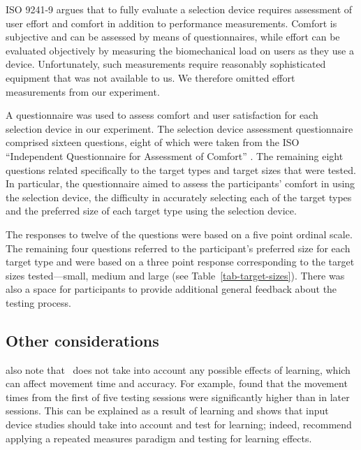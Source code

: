 \documentclass{elsart}
\begin{document}
ISO 9241-9 argues that to fully evaluate a selection device requires
assessment of user effort and comfort in addition to performance
measurements. Comfort is subjective and can be assessed by means of
questionnaires, while effort can be evaluated objectively by measuring
the biomechanical load on users as they use a device. Unfortunately,
such measurements require reasonably sophisticated equipment
\citep{Doug-SA-1999-CHI} that was not available to us. We therefore
omitted effort measurements from our experiment.

A questionnaire was used to assess comfort and user satisfaction for
each selection device in our experiment. The selection device assessment
questionnaire comprised sixteen questions, eight of which were taken
from the ISO ``Independent Questionnaire for Assessment of Comfort''
\citep{Doug-SA-1999-CHI}. The remaining eight questions related
specifically to the target types and target sizes that were tested. In
particular, the questionnaire aimed to assess the participants' comfort
in using the selection device, the difficulty in accurately selecting each
of the target types and the preferred size of each target type using the
selection device.

The responses to twelve of the questions were based on a five point
ordinal scale. The remaining four questions referred to the
participant's preferred size for each target type and were based on a
three point response corresponding to the target sizes tested---small,
medium and large (see Table~\ref{tab-target-sizes}). There was also a
space for participants to provide additional general feedback about the
testing process.


\subsection{Other considerations}
\label{sec-evaluation-other}

\citet{Doug-SA-1999-CHI} also note that \ISOnine\ does not take into
account any possible effects of learning, which can affect movement time
and accuracy. For example, \citet{Mack-IS-1991} found that the movement
times from the first of five testing sessions were significantly higher
than in later sessions. This can be explained as a result of learning
and shows that input device studies should take into account and test
for learning; indeed, \citet{Doug-SA-1999-CHI} recommend applying a
repeated measures paradigm and testing for learning effects.
\end{document}
